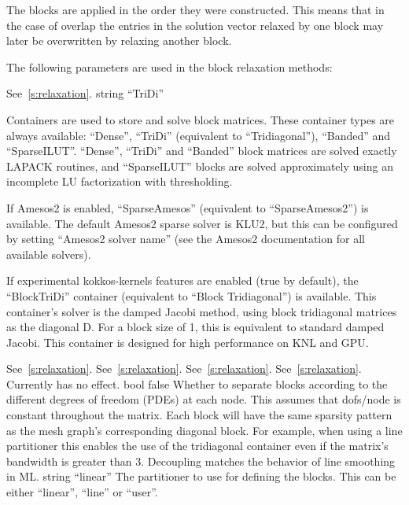 The blocks are applied in the order they were constructed. This means that in
the case of overlap the entries in the solution vector relaxed by one block may
later be overwritten by relaxing another block.

The following parameters are used in the block relaxation methods:

    {See~\ref{s:relaxation}.}
    {string}
    {``TriDi''}
    {Containers are used to store and solve block matrices. These container
     types are always available: ``Dense'', ``TriDi''
     (equivalent to ``Tridiagonal''), ``Banded'' and ``SparseILUT''.
     ``Dense'', ``TriDi'' and ``Banded'' block matrices are
     solved exactly LAPACK routines, and ``SparseILUT'' blocks are solved approximately
     using an incomplete LU factorization with thresholding.

     If Amesos2 is enabled, ``SparseAmesos'' (equivalent to ``SparseAmesos2'') is available.
     The default Amesos2 sparse solver is KLU2, but this can be configured by setting
     ``Amesos2 solver name'' (see the Amesos2 documentation for all available solvers).

     If experimental kokkos-kernels features are enabled (true by default), the ``BlockTriDi''
     container (equivalent to ``Block Tridiagonal'') is available. This container's solver is the damped Jacobi method, using
     block tridiagonal matrices as the diagonal D.
     For a block size of 1, this is equivalent to standard damped Jacobi.
     This container is designed for high performance on KNL and GPU.}
    {See~\ref{s:relaxation}.}
    {See~\ref{s:relaxation}.}
    {See~\ref{s:relaxation}.}
    {See~\ref{s:relaxation}. Currently has no effect. }
    {bool}
    {false}
    {Whether to separate blocks according to the different degrees of
     freedom (PDEs) at each node. This assumes that dofs/node is constant
     throughout the matrix. Each block will have the same sparsity
     pattern as the mesh graph's corresponding diagonal block.
     For example, when using a line partitioner this
     enables the use of the tridiagonal container even if the matrix's
     bandwidth is greater than 3.
     Decoupling matches the behavior of line smoothing in ML.}
    {string}
    {``linear''}
    {The partitioner to use for defining the blocks.  This can be either
     ``linear'', ``line'' or ``user''.}
